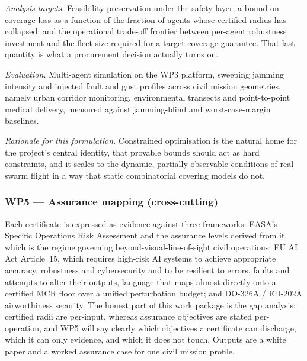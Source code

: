 \documentclass[11pt,a4paper]{article}
\begin{document}
\emph{Analysis targets.} Feasibility preservation under the safety layer; a bound on coverage loss as a function of the fraction of agents whose certified radius has collapsed; and the operational trade-off frontier between per-agent robustness investment and the fleet size required for a target coverage guarantee. That last quantity is what a procurement decision actually turns on.

\emph{Evaluation.} Multi-agent simulation on the WP3 platform, sweeping jamming intensity and injected fault and gust profiles across civil mission geometries, namely urban corridor monitoring, environmental transects and point-to-point medical delivery, measured against jamming-blind and worst-case-margin baselines.

\emph{Rationale for this formulation.} Constrained optimisation is the natural home for the project's central identity, that provable bounds should act as hard constraints, and it scales to the dynamic, partially observable conditions of real swarm flight in a way that static combinatorial covering models do not.

\subsubsection{WP5 --- Assurance mapping (cross-cutting)}
Each certificate is expressed as evidence against three frameworks: EASA's Specific Operations Risk Assessment and the assurance levels derived from it, which is the regime governing beyond-visual-line-of-sight civil operations; EU AI Act Article~15, which requires high-risk AI systems to achieve appropriate accuracy, robustness and cybersecurity and to be resilient to errors, faults and attempts to alter their outputs, language that maps almost directly onto a certified MCR floor over a unified perturbation budget; and DO-326A / ED-202A airworthiness security. The honest part of this work package is the gap analysis: certified radii are per-input, whereas assurance objectives are stated per-operation, and WP5 will say clearly which objectives a certificate can discharge, which it can only evidence, and which it does not touch. Outputs are a white paper and a worked assurance case for one civil mission profile.
\end{document}
